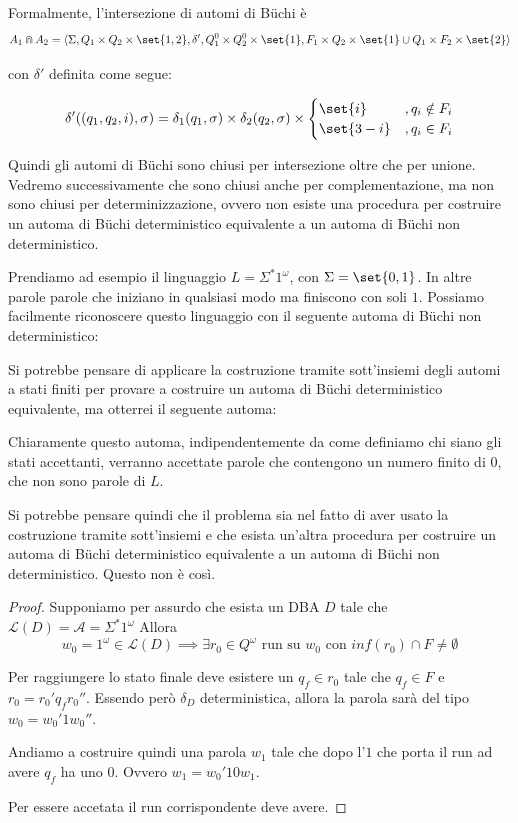 Formalmente, l'intersezione di automi di Büchi è
\[A_1 \Cap A_2 = \langle\Sigma, Q_1 \times Q_2\times\set{1,2}, \delta', Q_1^0 \times Q_2^0\times\set{1}, F_1 \times Q_2\times\set{1}\cup Q_1\times F_2\times\set{2} \rangle \]

con \(\delta'\) definita come segue:

\[\delta'((q_1,q_2,i),\sigma)=\delta_1(q_1,\sigma)\times\delta_2(q_2,\sigma)\times\begin{cases}
    \set{i}   & ,q_i\notin F_i \\
    \set{3-i} & ,q_i\in F_i
  \end{cases}\]

Quindi gli automi di Büchi sono chiusi per intersezione oltre che per unione. Vedremo successivamente che sono chiusi anche per complementazione, ma non sono chiusi per determinizzazione, ovvero non esiste una procedura per costruire un automa di Büchi deterministico equivalente a un automa di Büchi non deterministico.

Prendiamo ad esempio il linguaggio \(L = \Sigma^* 1^\omega\), con \(\Sigma= \set{0,1}\). In altre parole parole che iniziano in qualsiasi modo ma finiscono con soli \(1\). Possiamo facilmente riconoscere questo linguaggio con il seguente automa di Büchi non deterministico:

Si potrebbe pensare di applicare la costruzione tramite sott'insiemi degli automi a stati finiti per provare a costruire un automa di Büchi deterministico equivalente, ma otterrei il seguente automa:

Chiaramente questo automa, indipendentemente da come definiamo chi siano gli stati accettanti, verranno accettate parole che contengono un numero finito di \(0\), che non sono parole di \(L\).

Si potrebbe pensare quindi che il problema sia nel fatto di aver usato la costruzione tramite sott'insiemi e che esista un'altra procedura per costruire un automa di Büchi deterministico equivalente a un automa di Büchi non deterministico. Questo non è così.

\begin{proof}
  Supponiamo per assurdo che esista un DBA \(D\) tale che \(\mathcal{L}(D)=\mathcal{A} = \Sigma^* 1^\omega\)
  Allora
  \[w_0 = 1^\omega \in \mathcal{L}(D) \implies \exists r_0 \in Q^\omega \text{ run su } w_0 \text{ con } inf(r_0) \cap F \neq \emptyset\]

  Per raggiungere lo stato finale deve esistere un \(q_f \in r_0\) tale che \(q_f \in F\) e \(r_0=r_0' q_f r_0''\).
  Essendo però \(\delta_D\) deterministica, allora la parola sarà del tipo \(w_0=w_0'1w_0''\).

  Andiamo a costruire quindi una parola \(w_1\) tale che dopo l'\(1\) che porta il run ad avere \(q_f\) ha uno \(0\). Ovvero \(w_1 = w_0' 1 0 w_1\).

  Per essere accetata il run corrispondente deve avere.
\end{proof}

